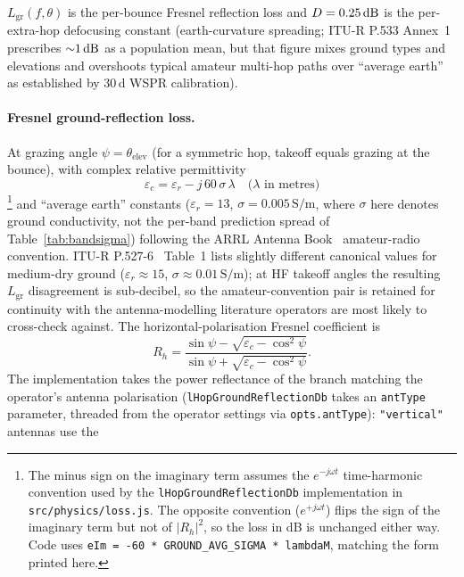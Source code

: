 \documentclass[11pt,a4paper]{article}
\newcommand{\SI}[2]{#1\,\text{#2}}
\newcommand{\dB}{\text{dB}}
\begin{document}
$L_{\text{gr}}(f, \theta)$ is the per-bounce Fresnel reflection
loss and $D = \SI{0.25}{\dB}$ is the per-extra-hop defocusing constant
(earth-curvature spreading; ITU-R P.533 Annex~1 prescribes
${\sim}\SI{1}{\dB}$ as a population mean, but that figure mixes ground
types and elevations and overshoots typical amateur multi-hop paths
over ``average earth'' as established by 30\,d WSPR calibration).

\paragraph{Fresnel ground-reflection loss.}  At grazing angle
$\psi = \theta_{\text{elev}}$ (for a symmetric hop, takeoff equals
grazing at the bounce), with complex relative permittivity
\begin{equation}
  \varepsilon_c = \varepsilon_r - j\,60\,\sigma\,\lambda
  \quad\text{($\lambda$ in metres)}
\end{equation}%
\footnote{The minus sign on the imaginary term assumes the
$e^{-j\omega t}$ time-harmonic convention used by the
\texttt{lHopGroundReflectionDb} implementation in
\texttt{src/physics/loss.js}.  The opposite convention
($e^{+j\omega t}$) flips the sign of the imaginary term but
not of $|R_h|^2$, so the loss in dB is unchanged either way.
Code uses \texttt{eIm = -60 * GROUND\_AVG\_SIGMA * lambdaM},
matching the form printed here.}
and ``average earth'' constants ($\varepsilon_r = 13$,
$\sigma = \SI{0.005}{S/m}$, where $\sigma$ here denotes ground
conductivity, not the per-band prediction spread of
Table~\ref{tab:bandsigma}) following the ARRL Antenna
Book~\cite{arrl2023antenna} amateur-radio convention.  ITU-R
P.527-6~\cite{itup527} Table~1 lists slightly different
canonical values for medium-dry ground ($\varepsilon_r \approx 15$,
$\sigma \approx \SI{0.01}{S/m}$); at HF takeoff angles the
resulting $L_{\text{gr}}$ disagreement is sub-decibel, so the
amateur-convention pair is retained for continuity with the
antenna-modelling literature operators are most likely to
cross-check against.  The horizontal-polarisation Fresnel
coefficient is
\begin{equation}
  R_h = \frac{\sin\psi - \sqrt{\varepsilon_c - \cos^2\psi}}
             {\sin\psi + \sqrt{\varepsilon_c - \cos^2\psi}}.
\end{equation}
The implementation takes the power reflectance of the branch
matching the operator's antenna polarisation
(\texttt{lHopGroundReflectionDb} takes an \texttt{antType}
parameter, threaded from the operator settings via
\texttt{opts.antType}): \texttt{"vertical"} antennas use the
\end{document}
